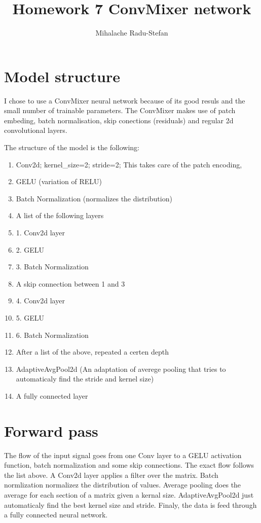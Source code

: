 \documentclass{article}
\title{Homework 7 ConvMixer network}
\author{Mihalache Radu-Stefan}
\begin{document}
\maketitle

\section{Model structure}

I chose to use a ConvMixer neural network because of its good resuls and the small number of trainable parameters. The ConvMixer makes use of patch embeding, batch normalisation, skip conections (residuals) and regular 2d convolutional layers.

The structure of the model is the following:

\begin{enumerate}
\item Conv2d; kernel\_size=2; stride=2; This takes care of the patch encoding,
\item GELU (variation of RELU)
\item Batch Normalization (normalizes the distribution)
\item A list of the following layers
\item 1. Conv2d layer
\item 2. GELU
\item 3. Batch Normalization
\item A skip connection between 1 and 3
\item 4. Conv2d layer
\item 5. GELU
\item 6. Batch Normalization
\item After a list of the above, repeated a certen depth
\item AdaptiveAvgPool2d (An adaptation of averege pooling that tries to automaticaly find the stride and kernel size)
\item A fully connected layer
\end{enumerate}


\section{Forward pass}

The flow of the input signal goes from one Conv layer to a GELU activation function, batch normalization and some skip connections. The exact flow follows the list above.
A Conv2d layer applies a filter over the matrix. Batch normlization normalizez the distribution of values. Average pooling does the average for each section of a matrix given a kernal size. AdaptiveAvgPool2d just automaticaly find the best kernel size and stride. Finaly, the data is feed through a fully connected neural network.
\end{document}
